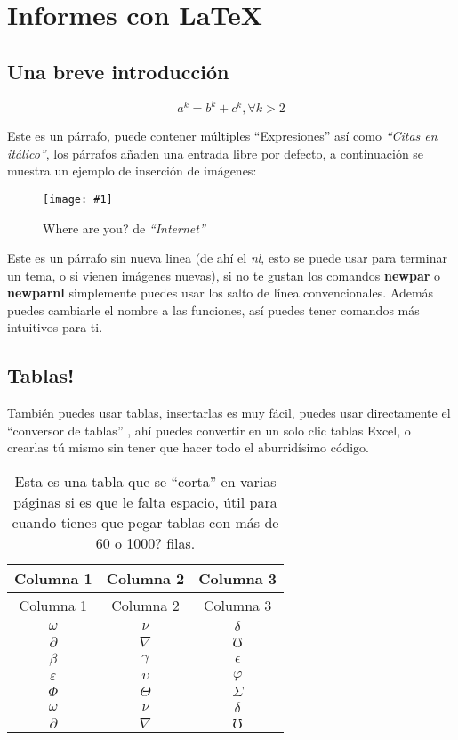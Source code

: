 \documentclass[letterpaper,11pt]{article}   %
\newcommand{\quotes}[1]{``#1''}             %
\newcommand{\quotesit}[1]{\textit{\quotes{#1}}} %
\newcommand{\newpar}[1]{\hbadness=10000 #1 ~\newline \par} %
\newcommand{\newparnl}[1]{#1 \par}          %
\newcommand{\pow}[2]{{#1}^{#2}}             %
\newcommand{\insertequation}[1]{            %
	\vspace{-0.1cm}
	\begin{mycapequ}[H]
		\begin{equation}
		#1
		\end{equation}
	\end{mycapequ}
	\vspace{-0.4cm}}
\newcommand{\insertimage}[3]{               %
	\vspace{-0.3cm}
	\begin{figure}[H]
		\centering
		\texttt{[image: \#1]}
		\caption{#3}
	\end{figure}
	\vspace{-0.2cm}}
\begin{document}
\section{Informes con \LaTeX}

	\subsection{Una breve introducción}
	
		\lipsum[1]
		
		\insertequation{\pow{a}{k}=\pow{b}{k}+\pow{c}{k}, \forall k>2}
		
		\newpar{Este es un párrafo, puede contener múltiples \quotes{Expresiones} así como \quotesit{Citas en itálico}, los párrafos añaden una entrada libre por defecto, a continuación se muestra un ejemplo de inserción de imágenes:}
		
		\insertimage{images/test-image.png}{0.2}{Where are you? de \quotesit{Internet}}
		
		\newparnl{Este es un párrafo sin nueva linea (de ahí el \textit{nl}, esto se puede usar para terminar un tema, o si vienen imágenes nuevas), si no te gustan los comandos \textbf{newpar} o \textbf{newparnl} simplemente puedes usar los salto de línea convencionales. Además puedes cambiarle el nombre a las funciones, así puedes tener comandos más intuitivos para ti.}
		
	\subsection{Tablas!}

		\newparnl{También puedes usar tablas, insertarlas es muy fácil, puedes usar directamente el \quotes{conversor de tablas} \textsuperscript{\cite{conversortabla}}, ahí puedes convertir en un solo clic tablas Excel, o crearlas tú mismo sin tener que hacer todo el aburridísimo código.}
		
		\begin{longtable}{ccc}
			\caption{Esta es una tabla que se \quotes{corta} en varias páginas si es que le falta espacio, útil para cuando tienes que pegar tablas con más de 60 o 1000? filas.}\label{foo}\\
			\hline
			Columna 1 & Columna 2 & Columna 3\\\hline
			\endfirsthead
			\hline
			Columna 1 & Columna 2 & Columna 3\\
			\hline
			\endhead
			\hline
			\endfoot
			\hline
			\endlastfoot
			$\omega$ & $\nu$ & $\delta$\\     
			$\partial$ & $\nabla$ & $\mho$\\
			$\beta$ & $\gamma$ & $\epsilon$\\   
			$\varepsilon$ & $\upsilon$ & $\varphi$\\
			$\Phi$ & $\Theta$ & $\varSigma$\\
			$\omega$ & $\nu$ & $\delta$\\     
			$\partial$ & $\nabla$ & $\mho$\\ 
		\end{longtable}
		
\end{document}
